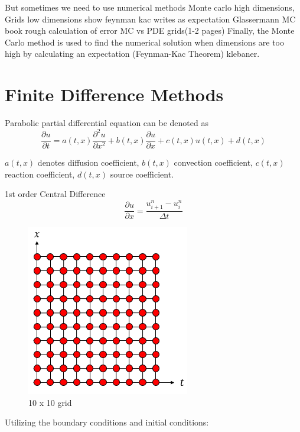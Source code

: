 \documentclass[12pt, oneside]{book}
\theoremstyle{plain}
\theoremstyle{definition}
\begin{document}
But sometimes we need to use numerical methods Monte carlo high dimensions, Grids low dimensions show feynman kac writes as expectation
Glassermann MC book rough calculation of error MC vs PDE grids(1-2 pages)
Finally, the Monte Carlo method is used to find the numerical solution when dimensions are too high by calculating an expectation (Feynman-Kac Theorem) klebaner.

\section{Finite Difference Methods}
Parabolic partial differential equation can be denoted as
$$ \frac{\partial u}{\partial t} = a(t,x) \frac{\partial^2 u}{\partial x^2} + b(t,x) \frac{\partial u}{\partial x} + c(t,x) u(t,x) + d(t,x) $$

$a(t,x)$ denotes diffusion coefficient,  $b(t,x)$ convection coefficient, $c(t,x)$ reaction coefficient, $d(t,x)$ source coefficient.

1st order Central Difference 
$$ \frac{\partial u}{\partial x} = \frac{u^{n}_{i+1} - u^n_i}{\Delta t} $$

    \begin{figure}[!htb]
        \centering
            \includegraphics[scale=0.9]{Discretize.png}
        \caption{10 x 10 grid}
    \end{figure}
    
Utilizing the boundary conditions and initial conditions:
\end{document}
